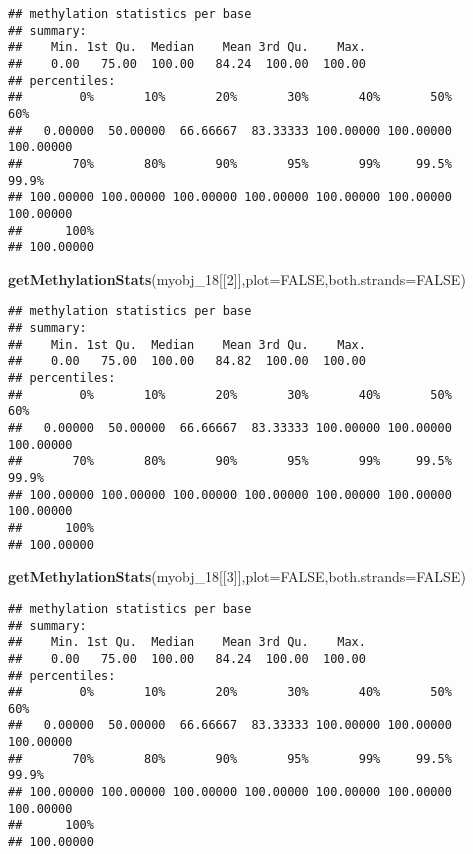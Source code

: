 \documentclass[]{article}
\newenvironment{Shaded}{\begin{snugshade}}{\end{snugshade}}
\newcommand{\KeywordTok}[1]{\textcolor[rgb]{0.13,0.29,0.53}{\textbf{#1}}}
\newcommand{\DataTypeTok}[1]{\textcolor[rgb]{0.13,0.29,0.53}{#1}}
\newcommand{\DecValTok}[1]{\textcolor[rgb]{0.00,0.00,0.81}{#1}}
\newcommand{\OtherTok}[1]{\textcolor[rgb]{0.56,0.35,0.01}{#1}}
\newcommand{\NormalTok}[1]{#1}
\begin{document}
\begin{verbatim}
## methylation statistics per base
## summary:
##    Min. 1st Qu.  Median    Mean 3rd Qu.    Max. 
##    0.00   75.00  100.00   84.24  100.00  100.00 
## percentiles:
##        0%       10%       20%       30%       40%       50%       60% 
##   0.00000  50.00000  66.66667  83.33333 100.00000 100.00000 100.00000 
##       70%       80%       90%       95%       99%     99.5%     99.9% 
## 100.00000 100.00000 100.00000 100.00000 100.00000 100.00000 100.00000 
##      100% 
## 100.00000
\end{verbatim}

\begin{Shaded}
\begin{Highlighting}[]
\KeywordTok{getMethylationStats}\NormalTok{(myobj_}\DecValTok{18}\NormalTok{[[}\DecValTok{2}\NormalTok{]],}\DataTypeTok{plot=}\OtherTok{FALSE}\NormalTok{,}\DataTypeTok{both.strands=}\OtherTok{FALSE}\NormalTok{)}
\end{Highlighting}
\end{Shaded}

\begin{verbatim}
## methylation statistics per base
## summary:
##    Min. 1st Qu.  Median    Mean 3rd Qu.    Max. 
##    0.00   75.00  100.00   84.82  100.00  100.00 
## percentiles:
##        0%       10%       20%       30%       40%       50%       60% 
##   0.00000  50.00000  66.66667  83.33333 100.00000 100.00000 100.00000 
##       70%       80%       90%       95%       99%     99.5%     99.9% 
## 100.00000 100.00000 100.00000 100.00000 100.00000 100.00000 100.00000 
##      100% 
## 100.00000
\end{verbatim}

\begin{Shaded}
\begin{Highlighting}[]
\KeywordTok{getMethylationStats}\NormalTok{(myobj_}\DecValTok{18}\NormalTok{[[}\DecValTok{3}\NormalTok{]],}\DataTypeTok{plot=}\OtherTok{FALSE}\NormalTok{,}\DataTypeTok{both.strands=}\OtherTok{FALSE}\NormalTok{)}
\end{Highlighting}
\end{Shaded}

\begin{verbatim}
## methylation statistics per base
## summary:
##    Min. 1st Qu.  Median    Mean 3rd Qu.    Max. 
##    0.00   75.00  100.00   84.24  100.00  100.00 
## percentiles:
##        0%       10%       20%       30%       40%       50%       60% 
##   0.00000  50.00000  66.66667  83.33333 100.00000 100.00000 100.00000 
##       70%       80%       90%       95%       99%     99.5%     99.9% 
## 100.00000 100.00000 100.00000 100.00000 100.00000 100.00000 100.00000 
##      100% 
## 100.00000
\end{verbatim}
\end{document}
